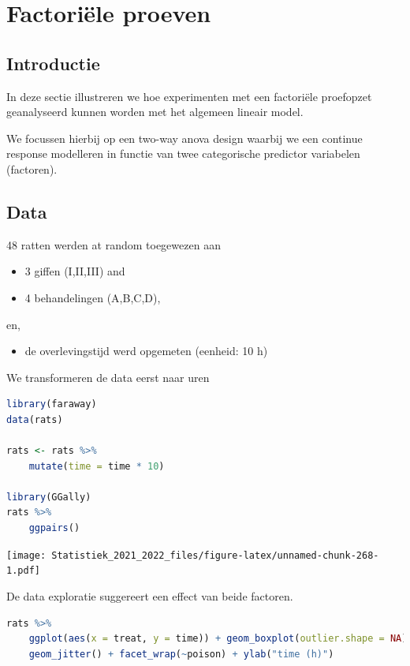 \documentclass[
  12pt,dutch,coursenotes]{book}
\providecommand{\tightlist}{%
  \setlength{\itemsep}{0pt}\setlength{\parskip}{0pt}}
\theoremstyle{definition}
\theoremstyle{definition}
\theoremstyle{definition}
\theoremstyle{definition}
\theoremstyle{remark}
\begin{document}
\hypertarget{factoriuxeble-proeven}{%
\section{Factoriële proeven}\label{factoriuxeble-proeven}}

\hypertarget{introductie}{%
\subsection{Introductie}\label{introductie}}

In deze sectie illustreren we hoe experimenten met een factoriële proefopzet geanalyseerd kunnen worden met het algemeen lineair model.

We focussen hierbij op een two-way anova design waarbij we een continue response modelleren in functie van twee categorische predictor variabelen (factoren).

\hypertarget{data-2}{%
\subsection{Data}\label{data-2}}

48 ratten werden at random toegewezen aan

\begin{itemize}
\tightlist
\item
  3 giffen (I,II,III) and
\item
  4 behandelingen (A,B,C,D),
\end{itemize}

en,

\begin{itemize}
\tightlist
\item
  de overlevingstijd werd opgemeten (eenheid: 10 h)
\end{itemize}

We transformeren de data eerst naar uren

\begin{lstlisting}[language=R]
library(faraway)
data(rats)

rats <- rats %>%
    mutate(time = time * 10)

library(GGally)
rats %>%
    ggpairs()
\end{lstlisting}

\texttt{[image: Statistiek\_2021\_2022\_files/figure-latex/unnamed-chunk-268-1.pdf]}

De data exploratie suggereert een effect van beide factoren.

\begin{lstlisting}[language=R]
rats %>%
    ggplot(aes(x = treat, y = time)) + geom_boxplot(outlier.shape = NA) +
    geom_jitter() + facet_wrap(~poison) + ylab("time (h)")
\end{lstlisting}
\end{document}
